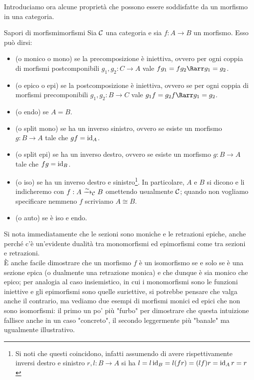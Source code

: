 \documentclass[openany]{book}
\renewcommand\C{\mc{C}}
\begin{document}
Introduciamo ora alcune proprietà che possono essere soddisfatte da un morfismo in una categoria.

\begin{definition}{Sapori di morfismi}{morfismi}
    Sia $\C$ una categoria e sia $f: A\to B$ un morfismo. Esso può dirsi:\begin{itemize}
        \item {} (o monico o mono) se la precomposizione è iniettiva, ovvero per ogni coppia di morfismi postcomponibili $g_1, g_2 : C\to A$ vale $fg_1 = fg_2 \Rarr g_1=g_2$.
        \item {} (o epico o epi) se la postcomposizione è iniettiva, ovvero se per ogni coppia di morfismi precomponibili $g_1, g_2 : B\to C$ vale $g_1f = g_2f \Rarr g_1=g_2$.
        \item {} (o endo) se $A=B$.
        \item {} (o split mono) se ha un inverso sinistro, ovvero se esiste un morfismo $g:B\to A$ tale che $gf = \operatorname{id}_A$.
        \item {} (o split epi) se ha un inverso destro, ovvero se esiste un morfismo $g:B\to A$ tale che $fg = \operatorname{id}_B$.
        \item {} (o iso) se ha un inverso destro e sinistro\footnote{Si noti che questi coincidono, infatti assumendo di avere rispettivamente inversi destro e sinistro $r, l : B\to A$ si ha $l = l \operatorname{id}_B = l(fr) = (lf)r = \operatorname{id}_A r = r $}. In particolare, $A$ e $B$ si dicono \bemph{isomorfi in $\C$ attraverso $f$} e li indicheremo con $f:A\iso_\C B$ omettendo usualmente $\C$; quando non vogliamo specificare nemmeno $f$ scriviamo $A\cong B$.
        \item {} (o auto) se è iso e endo.
    \end{itemize}    
\end{definition}

Si nota immediatamente che le sezioni sono moniche e le retrazioni epiche, anche perché c'è un'evidente dualità tra monomorfismi ed epimorfismi come tra sezioni e retrazioni.\\
È anche facile dimostrare che un morfismo $f$ è un isomorfismo se e solo se è una sezione epica (o dualmente una retrazione monica) e che dunque è sia monico che epico; per analogia al caso insiemistico, in cui i monomorfismi sono le funzioni iniettive e gli epimorfismi sono quelle suriettive, si potrebbe pensare che valga anche il contrario, ma vediamo due esempi di morfismi monici ed epici che non sono isomorfismi: il primo un po' più "furbo" per dimostrare che questa intuizione fallisce anche in un caso "concreto", il secondo leggermente più "banale" ma ugualmente illustrativo.
\end{document}
